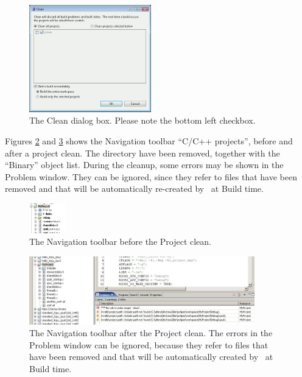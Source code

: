 \begin{figure}
  \begin{center}
    \includegraphics[width=5.3cm, bb=0 0 500 439]{images/clean2.png}
  \end{center}
  \caption{The Clean dialog box. Please note the bottom left checkbox.}
  \label{fig:clean2}
\end{figure}

Figures \ref{fig:clean3} and \ref{fig:clean4} shows the Navigation 
toolbar ``C/C++ projects'', before and after a project clean. The 
 directory have been removed, together with the ``Binary'' 
object list. During the cleanup, some errors may be shown in the Problem 
window. They can be ignored, since they refer to files that have been 
removed and that will be automatically re-created by \rtd\ at Build 
time. 

\begin{figure}
  \begin{center}
    \includegraphics[width=1.6cm, bb=0 0 157 126]{images/clean3.png}
  \end{center}
  \caption{The Navigation toolbar before the Project clean.}
  \label{fig:clean3}
\end{figure}


\begin{figure}
  \begin{center}
    \includegraphics[width=9.8cm, bb=0 0 974 294]{images/clean4.png}
  \end{center}
  \caption{The Navigation toolbar after the Project clean. The errors
in the Problem window can be ignored, because they refer to files that
have been removed and that will be automatically created by \rtd\
at Build time.}
  \label{fig:clean4}
\end{figure}


